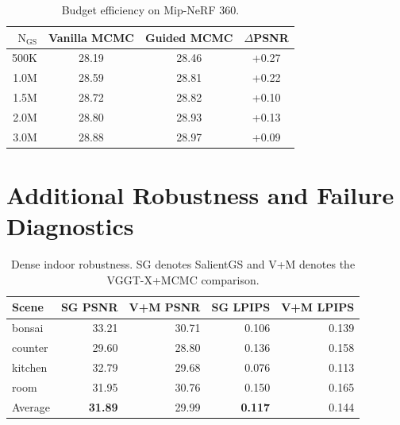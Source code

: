 \documentclass[sigconf]{acmart}
\begin{document}
\begin{table}[t]
    \centering
    \footnotesize
    \caption{Budget efficiency on Mip-NeRF 360.}
    \label{tab:supp_budget}
    \begin{tabular}{rccc}
        \toprule
        $\mathrm{N_{GS}}$ & Vanilla MCMC & Guided MCMC & $\Delta$PSNR \\
        \midrule
        500K & 28.19 & 28.46 & +0.27 \\
        1.0M & 28.59 & 28.81 & +0.22 \\
        1.5M & 28.72 & 28.82 & +0.10 \\
        2.0M & 28.80 & 28.93 & +0.13 \\
        3.0M & 28.88 & 28.97 & +0.09 \\
        \bottomrule
    \end{tabular}
\end{table}

\section{Additional Robustness and Failure Diagnostics}
\label{sec:supp_robustness}

\begin{table}[t]
    \centering
    \footnotesize
    \caption{Dense indoor robustness. SG denotes SalientGS and V+M denotes the VGGT-X+MCMC comparison.}
    \label{tab:supp_indoor}
    \begin{tabular}{lrrrr}
        \toprule
        Scene & SG PSNR & V+M PSNR & SG LPIPS & V+M LPIPS \\
        \midrule
        bonsai & 33.21 & 30.71 & 0.106 & 0.139 \\
        counter & 29.60 & 28.80 & 0.136 & 0.158 \\
        kitchen & 32.79 & 29.68 & 0.076 & 0.113 \\
        room & 31.95 & 30.76 & 0.150 & 0.165 \\
        Average & \textbf{31.89} & 29.99 & \textbf{0.117} & 0.144 \\
        \bottomrule
    \end{tabular}
\end{table}

\begin{table}[t]
    \centering
    \footnotesize
    \caption{Additional large-scene and drone-capture evidence.}
    \label{tab:supp_large_scene_summary}
\end{table}
\end{document}
